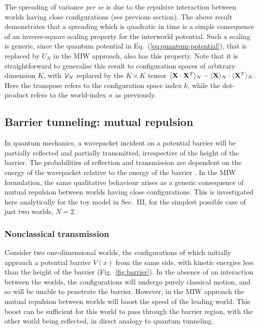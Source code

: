 \documentclass[twocolumn,aps,pra,amsmath,amssymb,superscriptaddress]{revtex4}
\renewcommand{\(}{\left(}
\renewcommand{\)}{\right)}
\newcommand{\blk}{\color{black}}
\begin{document}
The spreading of variance {\it per se} is due to the repulsive interaction
between worlds having close \blk configurations (see previous
section). The above result demonstrates that  a spreading which is \blk
quadratic in time is a simple consequence of an inverse-square scaling property
for the interworld potential.   Such a scaling is generic, since the quantum
potential in Eq.~(\ref{eq:quantum-potential}), that is replaced by $U_N$ in the
MIW approach, also has this property.  Note that it is straightforward to
generalise this result to configuration spaces of arbitrary dimension $K$, with
${\cal V}_N$ replaced by the $K\times K$ tensor $\langle {\bf X}\cdot{\bf X}^T \rangle_N -\langle {\bf
X}\rangle_N \cdot \langle{\bf X}^T\rangle_N$. Here the transpose refers to the 
configuration space index $k$, while the dot-product refers to the world-index $n$ 
as previously.\blk 

\subsection{Barrier tunneling: mutual repulsion}

In quantum mechanics, a wavepacket incident on a potential barrier will be
partially reflected and partially transmitted, irrespective of the height of the
barrier. The probabilities of reflection and transmission are dependent on the
energy of the wavepacket relative to the energy of the barrier \cite{merz}.  In
the MIW formulation, the same qualitative behaviour arises as a generic
consequence of mutual repulsion between worlds having close \blk
configurations.  This is investigated here analytically for the toy model in
Sec.~III, for the simplest possible case of just two worlds, $N=2$. 

\subsubsection{Nonclassical transmission}


Consider two one-dimensional worlds, the configurations of which initially approach a potential barrier $V(x)$ from the same side, with kinetic energies  less than the height of the barrier (Fig.~\ref{fig:barrier}).  In the absence of an interaction between the worlds, the configurations will undergo purely classical motion, and so will be unable to penetrate the barrier.  However, in the MIW  approach the mutual repulsion between worlds will boost the speed of the leading world.  This boost can be sufficient for this world to pass through the barrier region, with the other world being reflected, in direct analogy to quantum tunneling.
\end{document}
